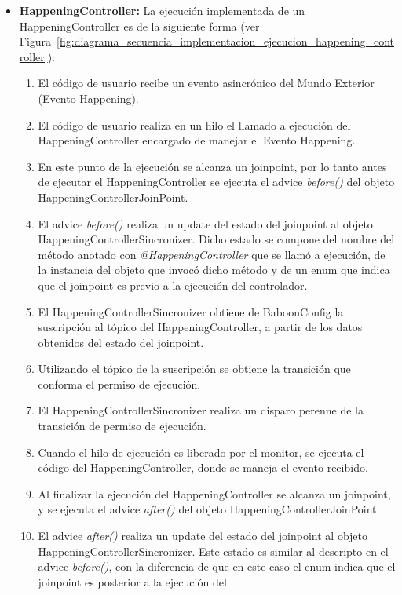 \begin{itemize}
  \item \textbf{HappeningController: } La ejecución implementada de un
  HappeningController es de la siguiente forma (ver
  Figura~\ref{fig:diagrama_secuencia_implementacion_ejecucion_happening_controller}):
  	\begin{enumerate}
  	  \item El código de usuario recibe un evento asincrónico del Mundo Exterior
  	  (Evento Happening).
  	  \item El código de usuario realiza en un hilo el llamado a ejecución del
  	  HappeningController encargado de manejar el Evento Happening.
  	  \item En este punto de la ejecución se alcanza un joinpoint, por lo tanto
  	  antes de ejecutar el HappeningController se ejecuta el advice
  	  \emph{before()} del objeto HappeningControllerJoinPoint.
  	  \item El advice \emph{before()} realiza un update del estado del joinpoint
  	  al objeto HappeningControllerSincronizer.
  	  Dicho estado se compone del nombre del método anotado con
  	  \emph{@HappeningController} que se llamó a ejecución, de la instancia del
  	  objeto que invocó dicho método y de un enum que indica que el joinpoint es
  	  previo a la ejecución del controlador.
  	  \item El HappeningControllerSincronizer obtiene de BaboonConfig la
  	  suscripción al tópico del HappeningController, a partir de los datos
  	  obtenidos del estado del joinpoint.
  	  \item Utilizando el tópico de la suscripción se obtiene la transición que
  	  conforma el permiso de ejecución.
  	  \item El HappeningControllerSincronizer realiza un disparo perenne de la
  	  transición de permiso de ejecución.
  	  \item  Cuando el hilo de ejecución es liberado por el monitor, se ejecuta
  	  el código del HappeningController, donde se maneja el evento recibido.
  	  \item Al finalizar la ejecución del HappeningController se alcanza un
  	  joinpoint, y se ejecuta el advice \emph{after()} del objeto
  	  HappeningControllerJoinPoint.
  	  \item El advice \emph{after()} realiza un update del estado del joinpoint
  	  al objeto HappeningControllerSincronizer. Este estado es similar al
  	  descripto en el advice \emph{before()}, con la diferencia de que en este
  	  caso el enum indica que el joinpoint es posterior a la ejecución del

\end{enumerate}
\end{itemize}
